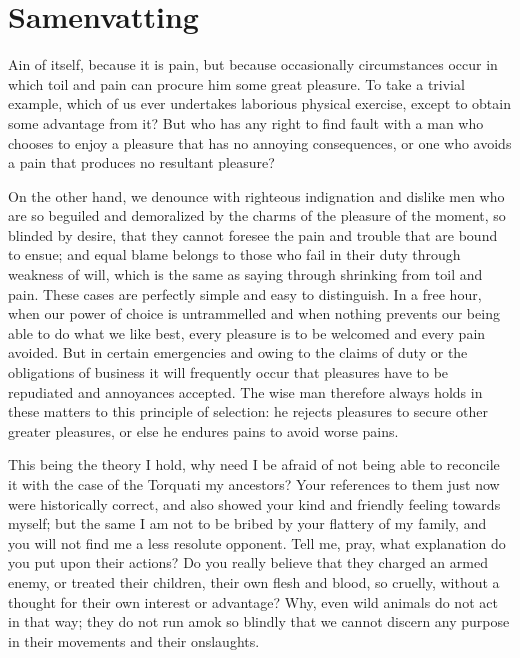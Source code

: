 \chapter{Samenvatting}%
\label{chap:samenvatting}

{

Ain of itself, because it is pain, but because occasionally circumstances occur in which toil and pain can procure him some great pleasure. To take a trivial example, which of us ever undertakes laborious physical exercise, except to obtain some advantage from it? But who has any right to find fault with a man who chooses to enjoy a pleasure that has no annoying consequences, or one who avoids a pain that produces no resultant pleasure?

On the other hand, we denounce with righteous indignation and dislike men who are so beguiled and demoralized by the charms of the pleasure of the moment, so blinded by desire, that they cannot foresee the pain and trouble that are bound to ensue; and equal blame belongs to those who fail in their duty through weakness of will, which is the same as saying through shrinking from toil and pain. These cases are perfectly simple and easy to distinguish. In a free hour, when our power of choice is untrammelled and when nothing prevents our being able to do what we like best, every pleasure is to be welcomed and every pain avoided.
But in certain emergencies and owing to the claims of duty or the obligations of business it will frequently occur that pleasures have to be repudiated and annoyances accepted. The wise man therefore always holds in these matters to this principle of selection: he rejects pleasures to secure other greater pleasures, or else he endures pains to avoid worse pains.

This being the theory I hold, why need I be afraid of not being able to reconcile it with the case of the Torquati my ancestors? Your references to them just now were historically correct, and also showed your kind and friendly feeling towards myself; but the same I am not to be bribed by your flattery of my family, and you will not find me a less resolute opponent. Tell me, pray, what explanation do you put upon their actions? Do you really believe that they charged an armed enemy, or treated their children, their own flesh and blood, so cruelly, without a thought for their own interest or advantage? Why, even wild animals do not act in that way; they do not run amok so blindly that we cannot discern any purpose in their movements and their onslaughts.

}
